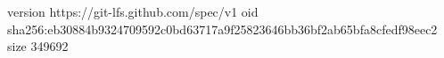 version https://git-lfs.github.com/spec/v1
oid sha256:eb30884b9324709592c0bd63717a9f25823646bb36bf2ab65bfa8cfedf98eec2
size 349692
